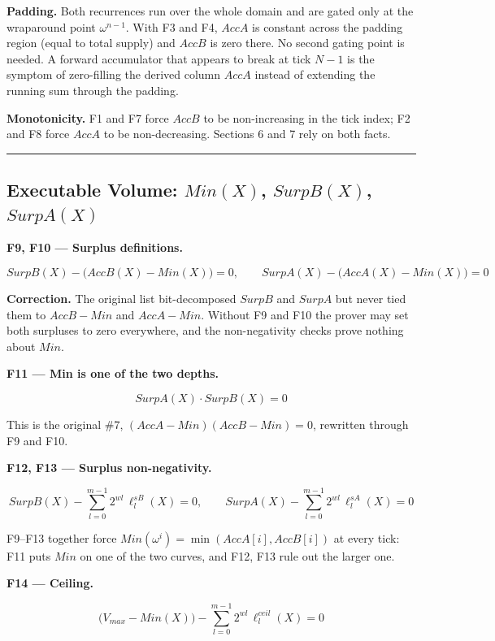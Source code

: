 \textbf{Padding.} Both recurrences run over the whole domain and are gated only at the wraparound point \(\omega^{n-1}\). With F3 and F4, \(AccA\) is constant across the padding region (equal to total supply) and \(AccB\) is zero there. No second gating point is needed. A forward accumulator that appears to break at tick \(N-1\) is the symptom of zero-filling the derived column \(AccA\) instead of extending the running sum through the padding.

\textbf{Monotonicity.} F1 and F7 force \(AccB\) to be non-increasing in the tick index; F2 and F8 force \(AccA\) to be non-decreasing. Sections 6 and 7 rely on both facts.

\begin{center}\rule{0.5\linewidth}{0.5pt}\end{center}

\subsection{\texorpdfstring{Executable Volume: \(Min(X)\), \(SurpB(X)\), \(SurpA(X)\)}{Executable Volume: Min(X), SurpB(X), SurpA(X)}}

\textbf{F9, F10 --- Surplus definitions.}

\[SurpB(X) - \big(AccB(X) - Min(X)\big) = 0, \qquad SurpA(X) - \big(AccA(X) - Min(X)\big) = 0\]

\textbf{Correction.} The original list bit-decomposed \(SurpB\) and \(SurpA\) but never tied them to \(AccB - Min\) and \(AccA - Min\). Without F9 and F10 the prover may set both surpluses to zero everywhere, and the non-negativity checks prove nothing about \(Min\).

\textbf{F11 --- Min is one of the two depths.}

\[SurpA(X) \cdot SurpB(X) = 0\]

This is the original \#7, \((AccA - Min)(AccB - Min) = 0\), rewritten through F9 and F10.

\textbf{F12, F13 --- Surplus non-negativity.}

\[SurpB(X) - \sum_{l=0}^{m-1} 2^{wl}\, \ell^{sB}_l(X) = 0, \qquad SurpA(X) - \sum_{l=0}^{m-1} 2^{wl}\, \ell^{sA}_l(X) = 0\]

F9--F13 together force \(Min(\omega^i) = \min(AccA[i], AccB[i])\) at every tick: F11 puts \(Min\) on one of the two curves, and F12, F13 rule out the larger one.

\textbf{F14 --- Ceiling.}

\[\big(V_{max} - Min(X)\big) - \sum_{l=0}^{m-1} 2^{wl}\, \ell^{ceil}_l(X) = 0\]

